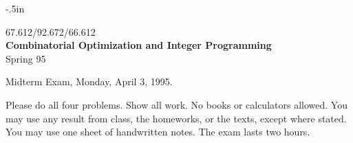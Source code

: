 
\oddsidemargin -.5in
\textwidth 7.5in
\textheight 9in
\topmargin -30pt




\begin{center}
  {\large
  67.612/92.672/66.612 \\
  {\bf Combinatorial Optimization and Integer Programming } \\
  Spring 95}
\end{center}

\begin{center}
  Midterm Exam, Monday, April 3, 1995.
\end{center}

Please do all four problems. Show all work. No books or calculators allowed.
You may use any result from class, the homeworks, or the texts, except where
stated.
You may use one sheet of handwritten notes.
The exam lasts two hours.


